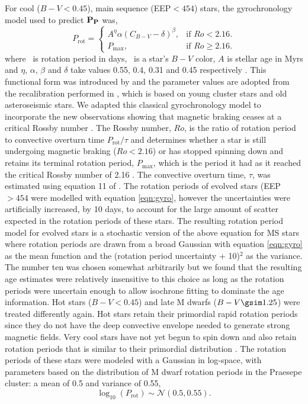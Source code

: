 For cool ($B-V < 0.45$), main sequence (EEP$<454$) stars, the gyrochronology
model used to predict $\bf{P_P}$ was,
\begin{equation}
    P_\mathrm{rot} =\begin{cases}
        A^\eta \alpha (C_{B-V} - \delta)^\beta, & \text{if $Ro < 2.16$}. \\
        P_{\mathrm{max}}, & \text{if $Ro \geq 2.16$}.
    \end{cases}
\label{eqn:gyro}
\end{equation}
where \prot\ is rotation period in days, \cbv\ is a star's $B-V$ color, $A$ is
stellar age in Myrs and $\eta$, $\alpha$, $\beta$ and $\delta$ take values
0.55, 0.4, 0.31 and 0.45 respectively \citep{angus2015}.
This functional form was introduced by \citep{barnes2007} and the parameter
values are adopted from the recalibration performed in \citet{angus2015},
which is based on young cluster stars and old asteroseismic stars.
We adapted this classical gyrochronology model to incorporate the new
observations showing that magnetic braking ceases at a critical Rossby number
\citep{vansaders2016}.
The Rossby number, $Ro$, is the ratio of rotation period to convective
overturn time $P_{\mathrm{rot}}/\tau$ and determines whether a star is still
undergoing magnetic braking ($Ro < 2.16$) or has stopped spinning down and
retains its terminal rotation period, $P_\mathrm{max}$, which is the period it
had as it reached the critical Rossby number of 2.16 \citep{vansaders2016}.
The convective overturn time, $\tau$, was estimated using equation 11 of
\citet{wright2011}.
The rotation periods of evolved stars (EEP $>454$ were modelled with equation
\ref{eqn:gyro}, however the uncertainties were artificially increased, by 10
days, to account for the large amount of scatter expected in the rotation
periods of these stars.
The resulting rotation period model for evolved stars is a stochastic version
of the above equation for MS stars where rotation periods are drawn from a
broad Gaussian with equation \ref{eqn:gyro} as the mean function and the
(rotation period uncertainty + 10)$^2$ as the variance.
The number ten was chosen somewhat arbitrarily but we found that the resulting
age estimates were relatively insensitive to this choice as long as the
rotation periods were uncertain enough to allow isochrone fitting to dominate
the age information.
Hot stars ($B-V < 0.45$) and late M dwarfs ($B-V \gsim 1.25$) were treated
differently again.
Hot stars retain their primordial rapid rotation periods since they do not
have the deep convective envelope needed to generate strong magnetic fields.
Very cool stars have not yet begun to spin down and also retain
rotation periods that is similar to their primordial distribution \citep[see
\eg][]{matt2012}.
The rotation periods of these stars were modeled with a Gaussian in log-space,
with parameters based on the distribution of M dwarf rotation periods in the
Praesepe cluster: a mean of 0.5 and variance of 0.55,
\begin{equation}
    \log_{10}(P_\mathrm{rot})\sim\mathcal{N}(0.5, 0.55).
\end{equation}

